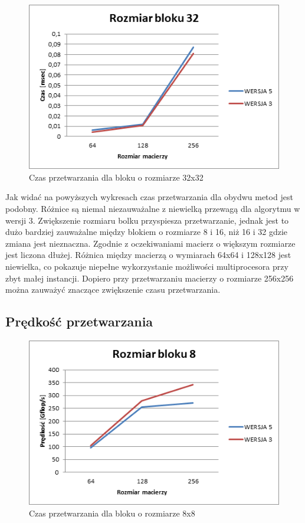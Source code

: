 \documentclass{article}
\begin{document}
\begin{figure}[H]
	\centering
	\includegraphics[width=\linewidth]{./images/graphs/time/graph3.png}
	\caption{Czas przetwarzania dla bloku o rozmiarze 32x32}
	\label{fig:grapht3}
\end{figure}

Jak widać na powyższych wykresach czas przetwarzania dla obydwu metod jest podobny. Różnice są niemal niezauważalne z niewielką przewagą dla algorytmu w wersji 3. Zwiększenie rozmiaru bolku przyspiesza przetwarzanie, jednak jest to dużo bardziej zauważalne między blokiem o rozmiarze 8 i 16, niż 16 i 32 gdzie zmiana jest nieznaczna. Zgodnie z oczekiwaniami macierz o większym rozmiarze jest liczona dłużej. Różnica między macierzą o wymiarach 64x64 i 128x128 jest niewielka, co pokazuje niepełne wykorzystanie możliwości multiprocesora przy zbyt małej instancji. Dopiero przy przetwarzaniu macierzy o rozmiarze 256x256 można zauważyć znaczące zwiększenie czasu przetwarzania.

\subsection{Prędkość przetwarzania}

\begin{figure}[H]
	\centering
	\includegraphics[width=\linewidth]{./images/graphs/fast/graph1.png}
	\caption{Czas przetwarzania dla bloku o rozmiarze 8x8}
	\label{fig:graphf1}
\end{figure}
\end{document}
